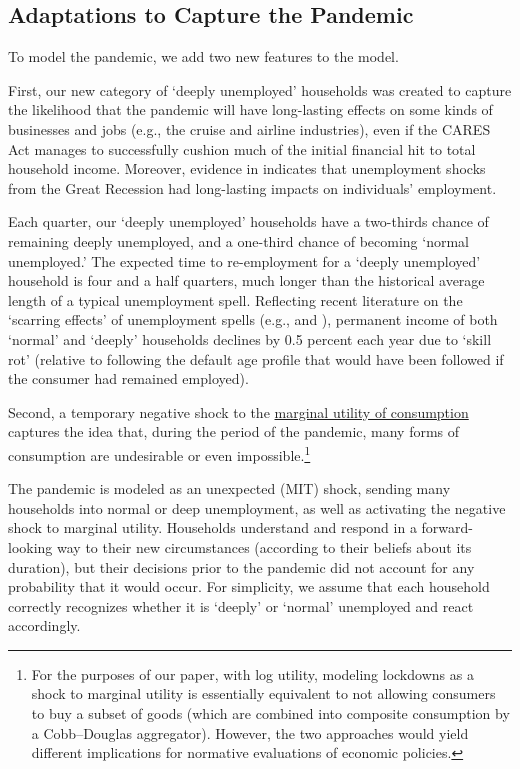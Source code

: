 \documentclass[titlepage,letterpaper]{\econtex}
\begin{document}
\subsection{Adaptations to Capture the Pandemic}

To model the pandemic, we add two new features to the model.

First, our new category of `deeply unemployed' households was created to capture the likelihood that the pandemic will have long-lasting effects on some kinds of businesses and jobs (e.g., the cruise and airline industries), even if the CARES Act manages to successfully cushion much of the initial financial hit to total household income.  Moreover, evidence in \cite{yagan_hysteresis} indicates that unemployment shocks from the Great Recession had long-lasting impacts on individuals' employment.

Each quarter, our `deeply unemployed' households have a two-thirds chance of remaining deeply unemployed, and a one-third chance of becoming `normal unemployed.'
The expected time to re-employment for a `deeply unemployed' household is four and a half quarters, much longer than the historical average length of a typical unemployment spell.
Reflecting recent literature on the `scarring effects' of unemployment spells (e.g., \cite{wachter_scarring} and \cite{hpv:cycleTrend}), permanent income of both `normal' and `deeply' households declines by 0.5 percent each year due to `skill rot' (relative to following the default age profile that would have been followed if the consumer had remained employed).

Second, a temporary negative shock to the \href{https://www.investopedia.com/terms/m/marginalutility.asp}{marginal utility of consumption} captures the idea that, during the period of the pandemic, many forms of consumption are undesirable or even impossible.\footnote{For the purposes of our paper, with log utility, modeling lockdowns as a shock to marginal utility is essentially equivalent to not allowing consumers to buy a subset of goods (which are combined into composite consumption by a Cobb--Douglas aggregator). However, the two approaches would yield different implications for normative evaluations of economic policies.}

The pandemic is modeled as an unexpected (MIT) shock, sending many households into normal or deep unemployment, as well as activating the negative shock to marginal utility. Households understand and respond in a forward-looking way to their new circumstances (according to their beliefs about its duration), but their decisions prior to the pandemic did not account for any probability that it would occur.  For simplicity, we assume that each household correctly recognizes whether it is `deeply' or `normal' unemployed and react accordingly.
\end{document}
